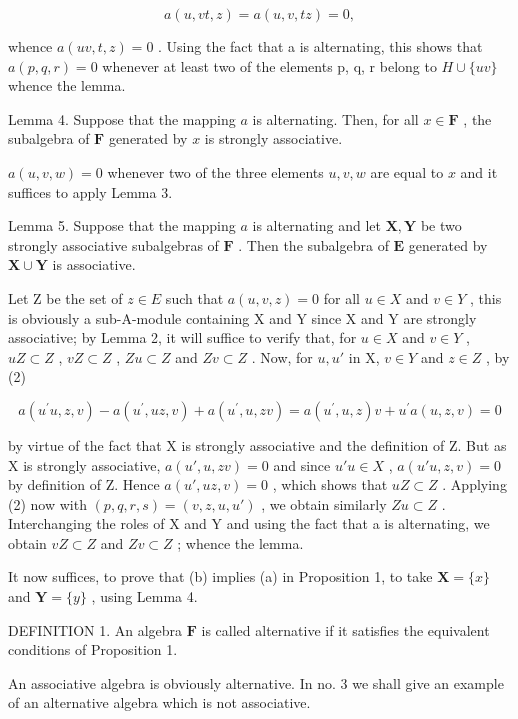 \[
a (u, v t, z) = a (u, v, t z) = 0,
\]

whence \(a(uv, t, z) = 0\) . Using the fact that a is alternating, this shows that \(a(p, q, r) = 0\) whenever at least two of the elements p, q, r belong to \(H \cup \{uv\}\) whence the lemma.

Lemma 4. Suppose that the mapping \(a\) is alternating. Then, for all \(x \in \mathbf{F}\) , the subalgebra of \(\mathbf{F}\) generated by \(x\) is strongly associative.

\(a(u,v,w) = 0\) whenever two of the three elements \(u, v, w\) are equal to \(x\) and it suffices to apply Lemma 3.

Lemma 5. Suppose that the mapping \(a\) is alternating and let \(\mathbf{X}, \mathbf{Y}\) be two strongly associative subalgebras of \(\mathbf{F}\) . Then the subalgebra of \(\mathbf{E}\) generated by \(\mathbf{X} \cup \mathbf{Y}\) is associative.

Let Z be the set of \(z \in E\) such that \(a(u, v, z) = 0\) for all \(u \in X\) and \(v \in Y\) , this is obviously a sub-A-module containing X and Y since X and Y are strongly associative; by Lemma 2, it will suffice to verify that, for \(u \in X\) and \(v \in Y\) , \(uZ \subset Z\) , \(vZ \subset Z\) , \(Zu \subset Z\) and \(Zv \subset Z\) . Now, for \(u, u'\) in X, \(v \in Y\) and \(z \in Z\) , by (2)

\[
a (u ^ {\prime} u, z, v) - a (u ^ {\prime}, u z, v) + a (u ^ {\prime}, u, z v) = a (u ^ {\prime}, u, z) v + u ^ {\prime} a (u, z, v) = 0
\]

by virtue of the fact that X is strongly associative and the definition of Z. But as X is strongly associative, \(a(u', u, zv) = 0\) and since \(u'u \in X\) , \(a(u'u, z, v) = 0\) by definition of Z. Hence \(a(u', uz, v) = 0\) , which shows that \(uZ \subset Z\) . Applying (2) now with \((p, q, r, s) = (v, z, u, u')\) , we obtain similarly \(Zu \subset Z\) . Interchanging the roles of X and Y and using the fact that a is alternating, we obtain \(vZ \subset Z\) and \(Zv \subset Z\) ; whence the lemma.

It now suffices, to prove that (b) implies (a) in Proposition 1, to take \(\mathbf{X} = \{x\}\) and \(\mathbf{Y} = \{y\}\) , using Lemma 4.

DEFINITION 1. An algebra \(\mathbf{F}\) is called alternative if it satisfies the equivalent conditions of Proposition 1.

An associative algebra is obviously alternative. In no. 3 we shall give an example of an alternative algebra which is not associative.

